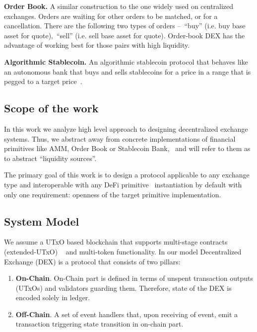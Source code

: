 \documentclass[11pt]{article}
\begin{document}
\begin{sloppypar}
        \textbf{Order Book.} A similar construction to the one widely used on centralized exchanges.
        Orders are waiting for other orders to be matched, or for a cancellation.
        There are the following two types of orders --~\enquote{buy} (i.e. buy base asset for quote),~\enquote{sell} (i.e. sell base asset for quote).
        Order-book DEX has the advantage of working best for those pairs with high liquidity.

        \textbf{Algorithmic Stablecoin.} An algorithmic stablecoin protocol that behaves like an autonomous bank that buys and sells stablecoins for a price in a range that is pegged to a target price~\cite{cryptoeprint:2021/1069}.

        \subsection{Scope of the work}\label{subsec:scope-of-the-work}
        In this work we analyze high level approach to designing decentralized exchange systems.
        Thus, we abstract away from concrete implementations of financial primitives like AMM, Order Book or Stablecoin Bank, \
        and will refer to them as to abstract \enquote{liquidity sources}.

        The primary goal of this work is to design a protocol applicable to any exchange type and interoperable with any DeFi primitive \
        instantiation by default with only one requirement: openness of the target primitive implementation.

        \subsection{System Model}\label{subsec:system-model}
        We assume a UTxO based blockchain that supports multi-stage contracts (extended-UTxO) ~\cite{chepurnoy2018selfreproducing} and multi-token functionality.
        In our model Decentralized Exchange (DEX) is a protocol that consists of two pillars:
        \begin{enumerate}
            \item \textbf{On-Chain}.
            On-Chain part is defined in terms of unspent transaction outputs (UTxOs) and validators guarding them.
            Therefore, state of the DEX is encoded solely in ledger.
            \item \textbf{Off-Chain}.
            A set of event handlers that, upon receiving of event, emit a transaction triggering state transition in on-chain part.
        \end{enumerate}


\end{sloppypar}
\end{document}
